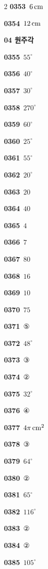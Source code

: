 \documentclass[10pt,a4paper]{article}
\begin{document}
\begin{multicols}{2}
\noindent\textbf{0353}\ $6\mkern3mu \mathrm{cm}$\par
\noindent\textbf{0354}\ $12\mkern3mu \mathrm{cm}$\par
\noindent\textbf{04 원주각}\par\smallskip
\noindent\textbf{0355}\ $55^\circ$\par
\noindent\textbf{0356}\ $40^\circ$\par
\noindent\textbf{0357}\ $30^\circ$\par
\noindent\textbf{0358}\ $270^\circ$\par
\noindent\textbf{0359}\ $60^\circ$\par
\noindent\textbf{0360}\ $25^\circ$\par
\noindent\textbf{0361}\ $55^\circ$\par
\noindent\textbf{0362}\ $20^\circ$\par
\noindent\textbf{0363}\ $20$\par
\noindent\textbf{0364}\ $40$\par
\noindent\textbf{0365}\ $4$\par
\noindent\textbf{0366}\ $7$\par
\noindent\textbf{0367}\ $80$\par
\noindent\textbf{0368}\ $16$\par
\noindent\textbf{0369}\ $10$\par
\noindent\textbf{0370}\ $75$\par
\noindent\textbf{0371}\ ⑤\par
\noindent\textbf{0372}\ $48^\circ$\par
\noindent\textbf{0373}\ ③\par
\noindent\textbf{0374}\ ②\par
\noindent\textbf{0375}\ $32^\circ$\par
\noindent\textbf{0376}\ ④\par
\noindent\textbf{0377}\ $4\pi\mkern3mu \mathrm{cm}^2$\par
\noindent\textbf{0378}\ ③\par
\noindent\textbf{0379}\ $64^\circ$\par
\noindent\textbf{0380}\ ②\par
\noindent\textbf{0381}\ $65^\circ$\par
\noindent\textbf{0382}\ $116^\circ$\par
\noindent\textbf{0383}\ ②\par
\noindent\textbf{0384}\ ②\par
\noindent\textbf{0385}\ $105^\circ$\par

\end{multicols}
\end{document}
